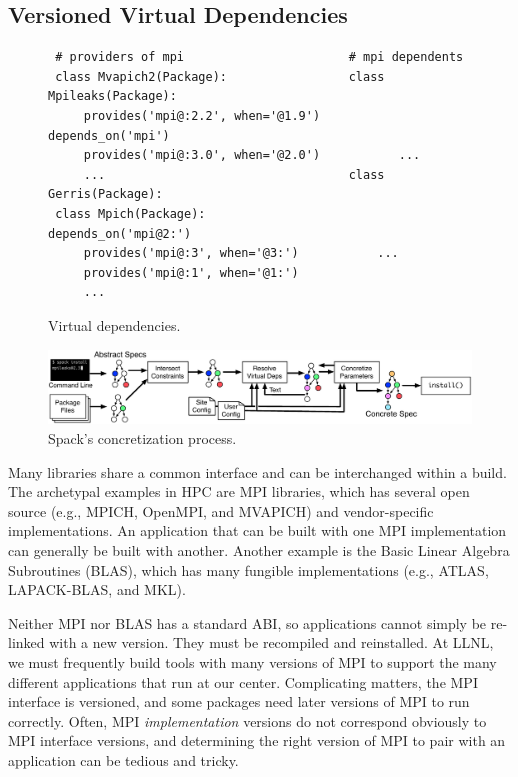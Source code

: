 
\subsection{Versioned Virtual Dependencies}\label{sec:virtual}

\begin{figure}
	\begin{verbatim}
 # providers of mpi                       # mpi dependents
 class Mvapich2(Package):                 class Mpileaks(Package):
     provides('mpi@:2.2', when='@1.9')        depends_on('mpi')
     provides('mpi@:3.0', when='@2.0')           ...
     ...                                  class Gerris(Package):
 class Mpich(Package):                        depends_on('mpi@2:')
     provides('mpi@:3', when='@3:')           ...
     provides('mpi@:1', when='@1:')
     ...
\end{verbatim}
\caption{
	Virtual dependencies.
	\label{fig:virtual-deps}
}
\end{figure}

\begin{figure}[ht!]
	\centering
	\includegraphics[width=.9\textwidth]{figs/concretization.pdf}
	\caption{
		Spack's concretization process.
		\label{fig:concretization}
	}
\end{figure}


Many libraries share a common interface and can be interchanged within a build.
The archetypal examples in HPC are MPI libraries, which has several
open source (e.g., MPICH, OpenMPI, and MVAPICH) and 
vendor-specific implementations. An application that can be built with 
one MPI implementation can generally be
built with another.  Another example is the Basic Linear Algebra
Subroutines (BLAS), which has many fungible implementations
(e.g., ATLAS, LAPACK-BLAS, and MKL).

Neither MPI nor BLAS has a standard ABI, so applications cannot simply be
re-linked with a new version. They must be recompiled and reinstalled.
At LLNL, we must frequently build tools with many versions of MPI to support
the many different applications that run at our center.
Complicating matters, the MPI interface is versioned, and some
packages need later versions of MPI to run correctly.  Often, MPI
{\it implementation} versions do not correspond obviously to MPI
interface versions, and determining the right version of
MPI to pair with an application can be tedious and tricky.

